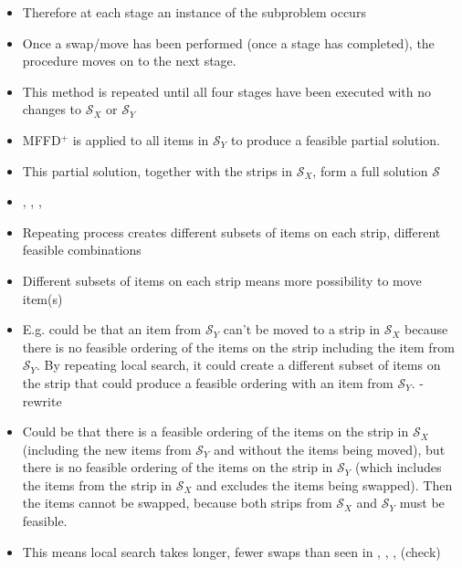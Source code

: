 \documentclass{elsarticle}
\begin{document}
\begin{itemize}
	\item Therefore at each stage an instance of the subproblem occurs
	\item Once a swap/move has been performed (once a stage has completed), the procedure moves on to the next stage.
	\item This method is repeated until all four stages have been executed with no changes to $\mathcal{S}_X$ or $\mathcal{S}_Y$
	\item MFFD$^+$ is applied to all items in $\mathcal{S}_Y$ to produce a feasible partial solution.
	\item This partial solution, together with the strips in $\mathcal{S}_X$, form a full solution $\mathcal{S}$
	\item \cite{lewis2009}, \cite{levine2004}, \cite{falkenauer1996}, \cite{martello1990b}
	\item Repeating process creates different subsets of items on each strip, different feasible combinations
	\item Different subsets of items on each strip means more possibility to move item(s)
	\item E.g. could be that an item from $\mathcal{S}_Y$ can't be moved to a strip in $\mathcal{S}_X$ because there is no feasible ordering of the items on the strip including the item from $\mathcal{S}_Y$. By repeating local search, it could create a different subset of items on the strip that could produce a feasible ordering with an item from $\mathcal{S}_Y$. - rewrite
	\item Could be that there is a feasible ordering of the items on the strip in $\mathcal{S}_X$ (including the new items from $\mathcal{S}_Y$ and without the items being moved), but there is no feasible ordering of the items on the strip in $\mathcal{S}_Y$ (which includes the items from the strip in $\mathcal{S}_X$ and excludes the items being swapped). Then the items cannot be swapped, because both strips from $\mathcal{S}_X$ and $\mathcal{S}_Y$ must be feasible. 
	\item This means local search takes longer, fewer swaps than seen in \cite{lewis2009}, \cite{lewis2017}, \cite{levine2004}, \cite{falkenauer1996} (check)
\end{itemize}
\end{document}
